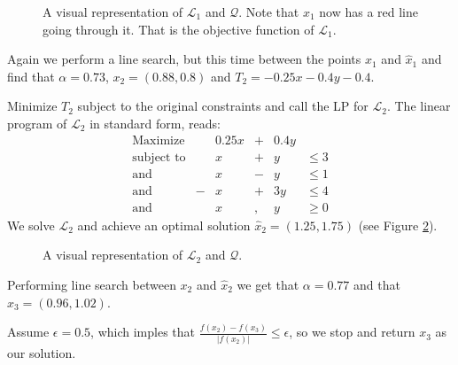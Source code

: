 \begin{figure}[ht!]
\centering

\caption{A visual representation of $\mathcal{L}_1$ and $\mathcal{Q}$.
         Note that $x_1$ now has a red line going through it. That is
         the objective function of $\mathcal{L}_1$.}
\label{fig:lp2}
\end{figure}

Again we perform a line search, but this time between the points $x_1$ and
$\hat{x}_1$ and find that $\alpha = 0.73$, $x_2 = (0.88, 0.8)$ and
$T_2 = -0.25x -0.4y -0.4$.

Minimize $T_2$ subject to the original constraints and call the LP for
$\mathcal{L}_2$.
The linear program of $\mathcal{L}_2$ in standard form, reads:
\[
\begin{array}{lcrcrl}
    \textrm{Maximize}   & & 0.25 x &+& 0.4 y & \\
    \textrm{subject to} & &      x &+&     y & \leq 3 \\
    \textrm{and}        & &      x &-&     y & \leq 1 \\
    \textrm{and}        &-&      x &+&   3 y & \leq 4 \\
    \textrm{and}        & &      x &,&     y & \geq 0
\end{array}
\]
We solve $\mathcal{L}_2$ and achieve an optimal solution $\hat{x}_2
= (1.25, 1.75)$ (see Figure \ref{fig:lp3}).
\begin{figure}[ht!]
\centering

\caption{A visual representation of $\mathcal{L}_2$ and $\mathcal{Q}$.}
\label{fig:lp3}
\end{figure}

Performing line search between $x_2$ and $\hat{x}_2$ we get that
$\alpha = 0.77$ and that $x_3 = (0.96, 1.02)$.


Assume $\epsilon = 0.5$, which imples that
$\frac{f(x_2) - f(x_3)}{|f(x_2)|} \leq \epsilon$, so we stop and return $x_3$
as our solution.

